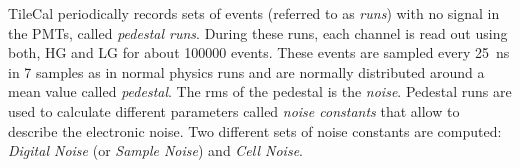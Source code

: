 TileCal periodically records sets of events (referred to as \emph{runs}) with no
signal in the PMTs, called \emph{pedestal runs}. During these runs, each channel
is read out using both, HG and LG for about 100000 events. These events are
sampled every 25~ns in 7 samples as in normal physics runs and are normally
distributed around a mean value called \emph{pedestal}. The \gls{rms} of the
pedestal is the \emph{noise}. Pedestal runs are used to calculate different
parameters called \emph{noise constants} that allow to describe the electronic
noise. Two different sets of noise constants are computed: \emph{Digital Noise}
(or \emph{Sample Noise}) and \emph{Cell Noise}.
